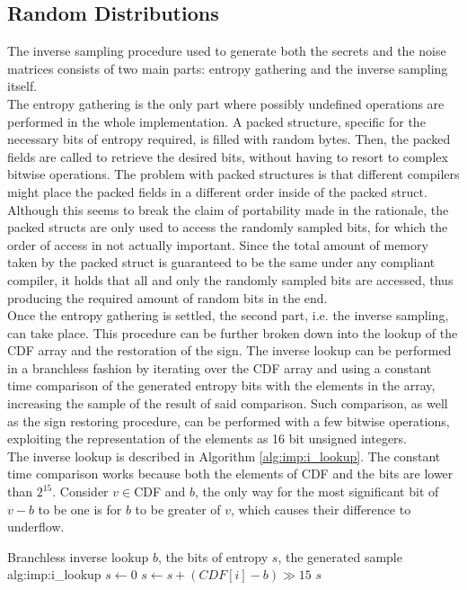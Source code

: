 \subsection{Random Distributions}\label{sec:imp:dist}
The inverse sampling procedure used to generate both the secrets and the noise matrices consists of two main parts: entropy gathering and the inverse sampling itself.\\
The entropy gathering is the only part where possibly undefined operations are performed in the whole implementation. A packed structure, specific for the necessary bits of entropy required, is filled with random bytes. Then, the packed fields are called to retrieve the desired bits, without having to resort to complex bitwise operations. The problem with packed structures is that different compilers might place the packed fields in a different order inside of the packed struct. Although this seems to break the claim of portability made in the rationale, the packed structs are only used to access the randomly sampled bits, for which the order of access in not actually important. Since the total amount of memory taken by the packed struct is guaranteed to be the same under any compliant compiler, it holds that all and only the randomly sampled bits are accessed, thus producing the required amount of random bits in the end.\\
Once the entropy gathering is settled, the second part, i.e. the inverse sampling, can take place. This procedure can be further broken down into the lookup of the CDF array and the restoration of the sign. The inverse lookup can be performed in a branchless fashion by iterating over the CDF array and using a constant time comparison of the generated entropy bits with the elements in the array, increasing the sample of the result of said comparison. Such comparison, as well as the sign restoring procedure, can be performed with a few bitwise operations, exploiting the representation of the elements as 16 bit unsigned integers.\\
The inverse lookup is described in Algorithm \ref{alg:imp:i_lookup}. The constant time comparison works because both the elements of CDF and the bits are lower than $2^{15}$. Consider $v\in$CDF and $b$, the only way for the most significant bit of $v-b$ to be one is for $b$ to be greater of $v$, which causes their difference to underflow.\\
\begin{b_algorithm}{Branchless inverse lookup}
{$b$, the bits of entropy}
{$s$, the generated sample}
{alg:imp:i_lookup}
\STATE $s\gets 0$
\STATE $s \gets s + (CDF[i]-b)\gg15$
\ENDFOR
\RETURN $s$
\end{b_algorithm}
